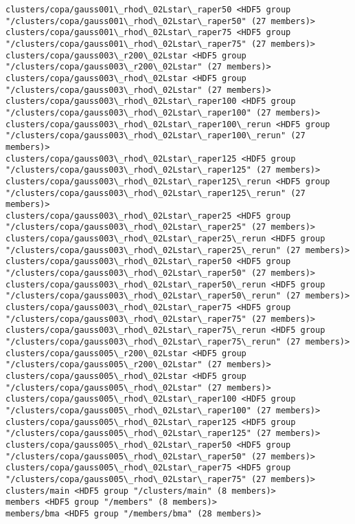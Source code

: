 \documentclass[11pt]{article}
\begin{document}
\begin{Verbatim}[commandchars=\\\{\}]
clusters/copa/gauss001\_rhod\_02Lstar\_raper50 <HDF5 group "/clusters/copa/gauss001\_rhod\_02Lstar\_raper50" (27 members)>
clusters/copa/gauss001\_rhod\_02Lstar\_raper75 <HDF5 group "/clusters/copa/gauss001\_rhod\_02Lstar\_raper75" (27 members)>
clusters/copa/gauss003\_r200\_02Lstar <HDF5 group "/clusters/copa/gauss003\_r200\_02Lstar" (27 members)>
clusters/copa/gauss003\_rhod\_02Lstar <HDF5 group "/clusters/copa/gauss003\_rhod\_02Lstar" (27 members)>
clusters/copa/gauss003\_rhod\_02Lstar\_raper100 <HDF5 group "/clusters/copa/gauss003\_rhod\_02Lstar\_raper100" (27 members)>
clusters/copa/gauss003\_rhod\_02Lstar\_raper100\_rerun <HDF5 group "/clusters/copa/gauss003\_rhod\_02Lstar\_raper100\_rerun" (27 members)>
clusters/copa/gauss003\_rhod\_02Lstar\_raper125 <HDF5 group "/clusters/copa/gauss003\_rhod\_02Lstar\_raper125" (27 members)>
clusters/copa/gauss003\_rhod\_02Lstar\_raper125\_rerun <HDF5 group "/clusters/copa/gauss003\_rhod\_02Lstar\_raper125\_rerun" (27 members)>
clusters/copa/gauss003\_rhod\_02Lstar\_raper25 <HDF5 group "/clusters/copa/gauss003\_rhod\_02Lstar\_raper25" (27 members)>
clusters/copa/gauss003\_rhod\_02Lstar\_raper25\_rerun <HDF5 group "/clusters/copa/gauss003\_rhod\_02Lstar\_raper25\_rerun" (27 members)>
clusters/copa/gauss003\_rhod\_02Lstar\_raper50 <HDF5 group "/clusters/copa/gauss003\_rhod\_02Lstar\_raper50" (27 members)>
clusters/copa/gauss003\_rhod\_02Lstar\_raper50\_rerun <HDF5 group "/clusters/copa/gauss003\_rhod\_02Lstar\_raper50\_rerun" (27 members)>
clusters/copa/gauss003\_rhod\_02Lstar\_raper75 <HDF5 group "/clusters/copa/gauss003\_rhod\_02Lstar\_raper75" (27 members)>
clusters/copa/gauss003\_rhod\_02Lstar\_raper75\_rerun <HDF5 group "/clusters/copa/gauss003\_rhod\_02Lstar\_raper75\_rerun" (27 members)>
clusters/copa/gauss005\_r200\_02Lstar <HDF5 group "/clusters/copa/gauss005\_r200\_02Lstar" (27 members)>
clusters/copa/gauss005\_rhod\_02Lstar <HDF5 group "/clusters/copa/gauss005\_rhod\_02Lstar" (27 members)>
clusters/copa/gauss005\_rhod\_02Lstar\_raper100 <HDF5 group "/clusters/copa/gauss005\_rhod\_02Lstar\_raper100" (27 members)>
clusters/copa/gauss005\_rhod\_02Lstar\_raper125 <HDF5 group "/clusters/copa/gauss005\_rhod\_02Lstar\_raper125" (27 members)>
clusters/copa/gauss005\_rhod\_02Lstar\_raper50 <HDF5 group "/clusters/copa/gauss005\_rhod\_02Lstar\_raper50" (27 members)>
clusters/copa/gauss005\_rhod\_02Lstar\_raper75 <HDF5 group "/clusters/copa/gauss005\_rhod\_02Lstar\_raper75" (27 members)>
clusters/main <HDF5 group "/clusters/main" (8 members)>
members <HDF5 group "/members" (8 members)>
members/bma <HDF5 group "/members/bma" (28 members)>

\end{Verbatim}
\end{document}
